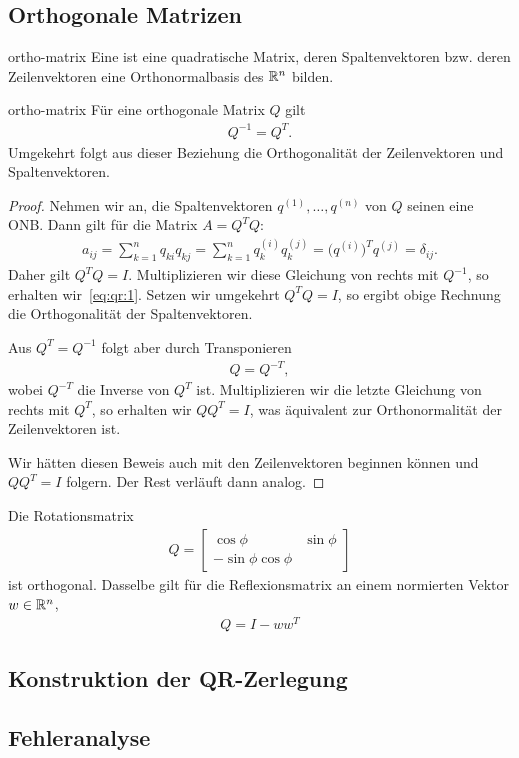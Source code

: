 \subsection{Orthogonale Matrizen}

\begin{Definition}{ortho-matrix}
  Eine  ist eine quadratische Matrix, deren
  Spaltenvektoren bzw. deren Zeilenvektoren eine Orthonormalbasis des
  $\mathbb R^n$ bilden.
\end{Definition}

\begin{Satz}{ortho-matrix}
  Für eine orthogonale Matrix $Q$ gilt
  \begin{gather}
    \label{eq:qr:1}
    Q^{-1} = Q^T.
  \end{gather}
  Umgekehrt folgt aus dieser Beziehung die Orthogonalität der
  Zeilenvektoren und Spaltenvektoren.
\end{Satz}

\begin{proof}
  Nehmen wir an, die Spaltenvektoren $q^{(1)},\dots,q^{(n)}$ von $Q$
  seinen eine ONB. Dann gilt für die Matrix $A = Q^TQ$:
  \begin{gather}
    a_{ij} = \sum_{k=1}^n q_{ki}q_{kj}
    = \sum_{k=1}^n q^{(i)}_k q^{(j)}_k
    = \bigl(q^{(i)}\bigr)^T q^{(j)} = \delta_{ij}.
  \end{gather}
  Daher gilt $Q^TQ=I$.  Multiplizieren wir diese Gleichung von rechts
  mit $Q^{-1}$, so erhalten wir~\eqref{eq:qr:1}. Setzen wir umgekehrt
  $Q^TQ=I$, so ergibt obige Rechnung die Orthogonalität der
  Spaltenvektoren.

  Aus $Q^T = Q^{-1}$ folgt aber durch Transponieren
  \begin{gather}
    Q = Q^{-T},
  \end{gather}
  wobei $Q^{-T}$ die Inverse von $Q^T$ ist. Multiplizieren wir die
  letzte Gleichung von rechts mit $Q^T$, so erhalten wir $QQ^T = I$,
  was äquivalent zur Orthonormalität der Zeilenvektoren ist.

  Wir hätten diesen Beweis auch mit den Zeilenvektoren beginnen können
  und $QQ^T=I$ folgern. Der Rest verläuft dann analog.
\end{proof}

\begin{example}
  Die Rotationsmatrix
  \begin{gather}
    Q = \begin{bmatrix}
      \cos \phi & \sin \phi\\-\sin\phi\cos\phi
    \end{bmatrix}
  \end{gather}
  ist orthogonal. Dasselbe gilt für die Reflexionsmatrix an einem
  normierten Vektor $w\in \mathbb R^n$,
  \begin{gather}
    Q = I-ww^T
  \end{gather}
\end{example}

\subsection{Konstruktion der QR-Zerlegung}

\subsection{Fehleranalyse}


